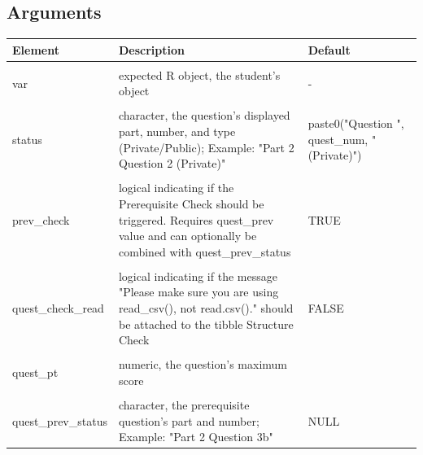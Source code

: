 \documentclass[
  12pt,
]{book}
\begin{document}
\subsection*{Arguments}\label{arguments}

\renewcommand{\arraystretch}{2}

\begin{longtable}{>{\raggedright\arraybackslash}p{4cm}>{\raggedright\arraybackslash}p{8cm}>{\raggedright\arraybackslash}p{4cm}}
\toprule
\textbf{Element} & \textbf{Description} & \textbf{Default}\\
\midrule
\cellcolor{gray!10}{var\_name} & \cellcolor{gray!10}{character, the expected name of var} & \cellcolor{gray!10}{-}\\
\hline
var & expected R object, the student's object & -\\
\hline
\cellcolor{gray!10}{var\_test} & \cellcolor{gray!10}{other R object, the answer key's object to be compared with var} & \cellcolor{gray!10}{-}\\
\hline
status & character, the question's displayed part, number, and type (Private/Public); Example: "Part 2 Question 2 (Private)" & paste0("Question ", quest\_num, " (Private)")\\
\hline
\cellcolor{gray!10}{var\_status} & \cellcolor{gray!10}{the data type of var; Example: "tib" (tibble), "vect" (vector), "lst" (list), "plt" (plot)} & \cellcolor{gray!10}{"tib"}\\
\hline
prev\_check & logical indicating if the Prerequisite Check should be triggered. Requires quest\_prev value and can optionally be combined with quest\_prev\_status & TRUE\\
\hline
\cellcolor{gray!10}{is\_tibble\_check} & \cellcolor{gray!10}{logical indicating if the tibble Structure Check should be triggered} & \cellcolor{gray!10}{TRUE}\\
\hline
quest\_check\_read & logical indicating if the message "Please make sure you are using read\_csv(), not read.csv()." should be attached to the tibble Structure Check & FALSE\\
\hline
\cellcolor{gray!10}{quest\_num} & \cellcolor{gray!10}{numeric, the question's number} & \cellcolor{gray!10}{0}\\
\hline
quest\_pt & numeric, the question's maximum score & 0\\
\hline
\cellcolor{gray!10}{quest\_prev} & \cellcolor{gray!10}{numeric, the prerequisite question's number} & \cellcolor{gray!10}{1}\\
\hline
quest\_prev\_status & character, the prerequisite question's part and number; Example: "Part 2 Question 3b" & NULL\\
\bottomrule
\end{longtable}
\end{document}
